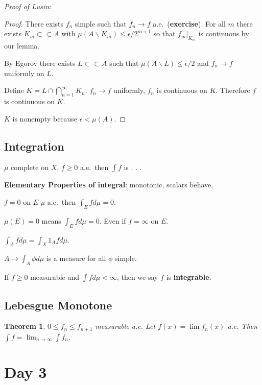 \documentclass[11pt]{article}
\newtheorem{thm}{Theorem}[section]
\newenvironment{defn}[1][Definition]{\begin{trivlist}
\item[\hskip \labelsep {\bfseries #1}]}{\end{trivlist}}
\newcommand{\ra}{\rightarrow}
\newcommand{\sbs}{\subset}
\newcommand{\bs}{\backslash}
\newcommand{\ep}{\epsilon}
\newcommand{\bca}[2]{\bigcap_{#1}^{#2}}
\begin{document}
{\it Proof of Lusin}: 
\begin{proof}
There exists $f_n$ simple such that $f_n\ra f$ a.e.\ ({\bf exercise}). For all $m$ there exists $K_m\sbs\sbs A$ with $\mu(A\bs K_m)\le \ep/2^{m+1}$ so that $f_m|_{K_m}$ is continuous by our lemma. 

By Egorov there exists $L\sbs\sbs A$ such that $\mu(A\bs L)\le\ep/2$ and $f_n\ra f$ uniformly on $L$. 

Define $K=L\cap \bca{n=1}{\infty}K_n$. $f_n\ra f$ uniformly, $f_n$ is continuous on $K$. Therefore $f$ is continuous on $K$. 

$K$ is nonempty because $\ep<\mu(A)$. 
\end{proof}

\subsection{Integration}

\begin{defn}
$\mu$ complete on $X$, $f\ge 0$ a.e.\, then $\int f$ is . . . 
\end{defn}

{\bf Elementary Properties of integral}:
monotonic, scalars behave,

$f=0$ on $E$ $\mu$ a.e.\ then $\int_E fd\mu=0$.

$\mu(E)=0$ means $\int_E fd\mu=0$. Even if $f=\infty$ on $E$.

$\int_A fd\mu=\int_X1_Afd\mu$. 

$A\mapsto \int_A\phi d\mu$ is a measure for all $\phi$ simple.  

\begin{defn}
If $f\ge 0$ measurable and $\int fd\mu<\infty$, then we say $f$ is {\bf integrable}. 
\end{defn}

\subsection{Lebesgue Monotone}

\begin{thm}
$0\le f_n\le f_{n+1}$ measurable a.e. Let $f(x)=\lim f_n(x)$ a.e. Then $\int f=\lim_{n\ra\infty}\int f_n$. 
\end{thm}

\section{Day 3}
\end{document}
